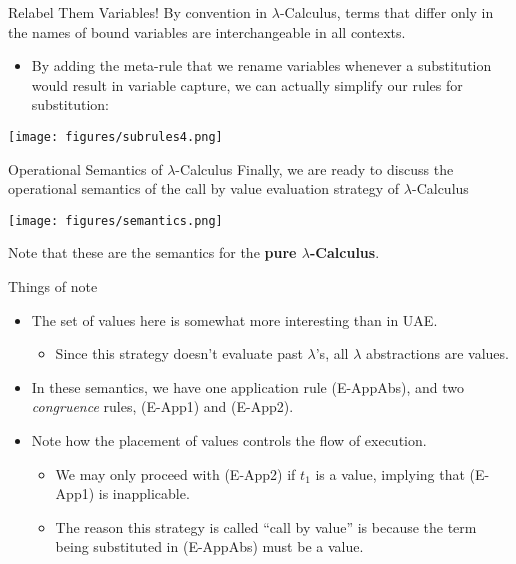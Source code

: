 \documentclass[11pt]{beamer}
\begin{document}
\begin{frame}[fragile=singleslide]{Relabel Them Variables!}
By convention in $\lambda$-Calculus, terms that differ only in the names of bound variables are interchangeable in all contexts.  
\begin{itemize}
\item By adding the meta-rule that we rename variables whenever a substitution would result in variable capture, we can actually simplify our rules for substitution:
\end{itemize}

\texttt{[image: figures/subrules4.png]}

\end{frame}


\begin{frame}[fragile=singleslide]{Operational Semantics of $\lambda$-Calculus}
Finally, we are ready to discuss the operational semantics of the call by value evaluation strategy of $\lambda$-Calculus
\begin{center}
\texttt{[image: figures/semantics.png]}
\end{center}
Note that these are the semantics for the \textbf{pure $\lambda$-Calculus}.  
\end{frame}


\begin{frame}[fragile=singleslide]{Things of note}
\begin{itemize}
\item The set of values here is somewhat more interesting than in UAE.  
\begin{itemize}
\item Since this strategy doesn't evaluate past $\lambda$'s, all $\lambda$ abstractions are values.  
\end{itemize}
\item In these semantics, we have one application rule (E-AppAbs), and two \emph{congruence} rules, (E-App1) and (E-App2).
\item Note how the placement of values controls the flow of execution.  
\begin{itemize}
\item We may only proceed with (E-App2) if $t_1$ is a value, implying that (E-App1) is inapplicable.  
\item The reason this strategy is called ``call by value'' is because the term being substituted in (E-AppAbs) must be a value. 
\end{itemize}
\end{itemize}

\end{frame}
\end{document}
